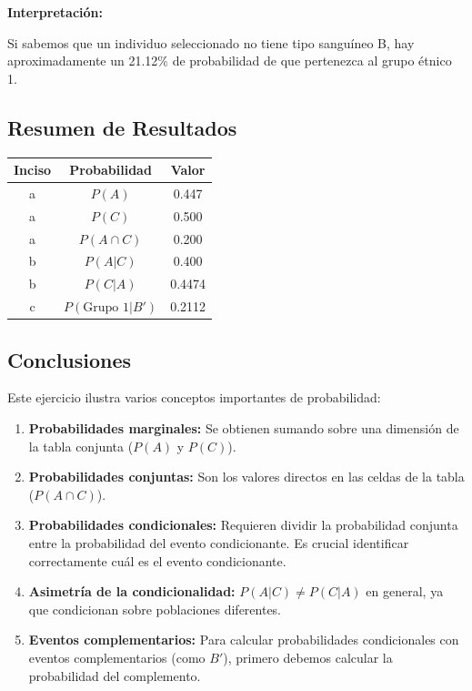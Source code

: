 \documentclass[a4paper]{article}
\begin{document}
\textbf{Interpretación:}

Si sabemos que un individuo seleccionado no tiene tipo sanguíneo B, hay aproximadamente un 21.12\% de probabilidad de que pertenezca al grupo étnico 1.

\subsection*{Resumen de Resultados}

\begin{center}
\begin{tabular}{|c|c|c|}
\hline
\textbf{Inciso} & \textbf{Probabilidad} & \textbf{Valor} \\
\hline
a & $P(A)$ & 0.447 \\
\hline
a & $P(C)$ & 0.500 \\
\hline
a & $P(A \cap C)$ & 0.200 \\
\hline
b & $P(A|C)$ & 0.400 \\
\hline
b & $P(C|A)$ & 0.4474 \\
\hline
c & $P(\text{Grupo 1} | B')$ & 0.2112 \\
\hline
\end{tabular}
\end{center}

\subsection*{Conclusiones}

Este ejercicio ilustra varios conceptos importantes de probabilidad:

\begin{enumerate}
    \item \textbf{Probabilidades marginales:} Se obtienen sumando sobre una dimensión de la tabla conjunta ($P(A)$ y $P(C)$).
    
    \item \textbf{Probabilidades conjuntas:} Son los valores directos en las celdas de la tabla ($P(A \cap C)$).
    
    \item \textbf{Probabilidades condicionales:} Requieren dividir la probabilidad conjunta entre la probabilidad del evento condicionante. Es crucial identificar correctamente cuál es el evento condicionante.
    
    \item \textbf{Asimetría de la condicionalidad:} $P(A|C) \neq P(C|A)$ en general, ya que condicionan sobre poblaciones diferentes.
    
    \item \textbf{Eventos complementarios:} Para calcular probabilidades condicionales con eventos complementarios (como $B'$), primero debemos calcular la probabilidad del complemento.
\end{enumerate}
\end{document}
